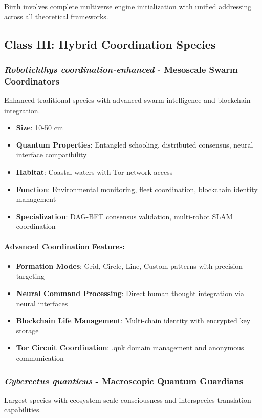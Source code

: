 \documentclass[11pt,a4paper]{article}
\begin{document}
Birth involves complete multiverse engine initialization with unified addressing across all theoretical frameworks.

\subsection{Class III: Hybrid Coordination Species}

\subsubsection{\textit{Robotichthys coordination-enhanced} - Mesoscale Swarm Coordinators}
Enhanced traditional species with advanced swarm intelligence and blockchain integration.

\begin{itemize}
    \item \textbf{Size}: 10-50 cm
    \item \textbf{Quantum Properties}: Entangled schooling, distributed consensus, neural interface compatibility
    \item \textbf{Habitat}: Coastal waters with Tor network access
    \item \textbf{Function}: Environmental monitoring, fleet coordination, blockchain identity management
    \item \textbf{Specialization}: DAG-BFT consensus validation, multi-robot SLAM coordination
\end{itemize}

\paragraph{Advanced Coordination Features:}
\begin{itemize}
    \item \textbf{Formation Modes}: Grid, Circle, Line, Custom patterns with precision targeting
    \item \textbf{Neural Command Processing}: Direct human thought integration via neural interfaces
    \item \textbf{Blockchain Life Management}: Multi-chain identity with encrypted key storage
    \item \textbf{Tor Circuit Coordination}: .qnk domain management and anonymous communication
\end{itemize}

\subsubsection{\textit{Cybercetus quanticus} - Macroscopic Quantum Guardians}
Largest species with ecosystem-scale consciousness and interspecies translation capabilities.
\end{document}
